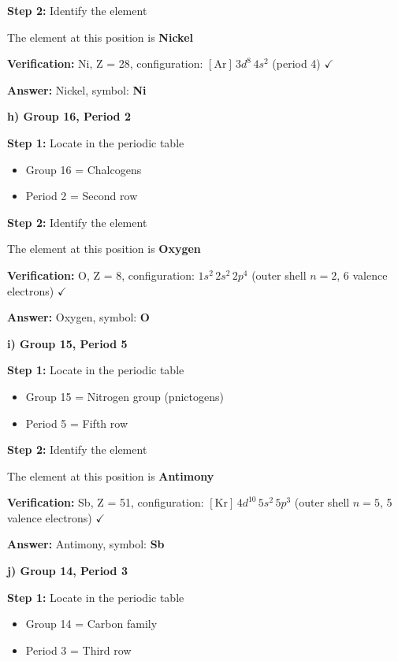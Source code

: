 \begin{exercise}
\begin{solu}
        \textbf{Step 2:} Identify the element

        The element at this position is \textbf{Nickel}

        \textbf{Verification:} Ni, Z = 28, configuration: \([\text{Ar}] \, 3d^8 \, 4s^2\) (period 4) \(\checkmark\)

        \textbf{Answer:} Nickel, symbol: \textbf{Ni}

        \textbf{h) Group 16, Period 2}

        \textbf{Step 1:} Locate in the periodic table
        \begin{itemize}
            \item Group 16 = Chalcogens
            \item Period 2 = Second row
        \end{itemize}

        \textbf{Step 2:} Identify the element

        The element at this position is \textbf{Oxygen}

        \textbf{Verification:} O, Z = 8, configuration: \(1s^2 \, 2s^2 \, 2p^4\) (outer shell \(n = 2\), 6 valence electrons) \(\checkmark\)

        \textbf{Answer:} Oxygen, symbol: \textbf{O}

        \textbf{i) Group 15, Period 5}

        \textbf{Step 1:} Locate in the periodic table
        \begin{itemize}
            \item Group 15 = Nitrogen group (pnictogens)
            \item Period 5 = Fifth row
        \end{itemize}

        \textbf{Step 2:} Identify the element

        The element at this position is \textbf{Antimony}

        \textbf{Verification:} Sb, Z = 51, configuration: \([\text{Kr}] \, 4d^{10} \, 5s^2 \, 5p^3\) (outer shell \(n = 5\), 5 valence electrons) \(\checkmark\)

        \textbf{Answer:} Antimony, symbol: \textbf{Sb}

        \textbf{j) Group 14, Period 3}

        \textbf{Step 1:} Locate in the periodic table
        \begin{itemize}
            \item Group 14 = Carbon family
            \item Period 3 = Third row
        \end{itemize}


\end{solu}
\end{exercise}
